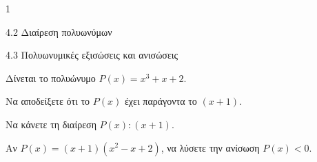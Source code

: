 \begin{ylh}{1}
\item 4.2 Διαίρεση πολυωνύμων
\item 4.3 Πολυωνυμικές εξισώσεις και ανισώσεις
\end{ylh}
Δίνεται το πολυώνυμο $P(x) = x^{3} + x + 2$.
\begin{alist}
\item
\end{alist}
\begin{alist}
\item
  Να αποδείξετε ότι το $P(x)$ έχει παράγοντα το $(x + 1)$.
\end{alist}
\begin{alist}
\item
  Να κάνετε τη διαίρεση $P(x):(x + 1)$.
\item Αν $P(x) = (x + 1)(x^{2} - x + 2)$, να λύσετε την ανίσωση $P(x) < 0$.
\end{alist}

